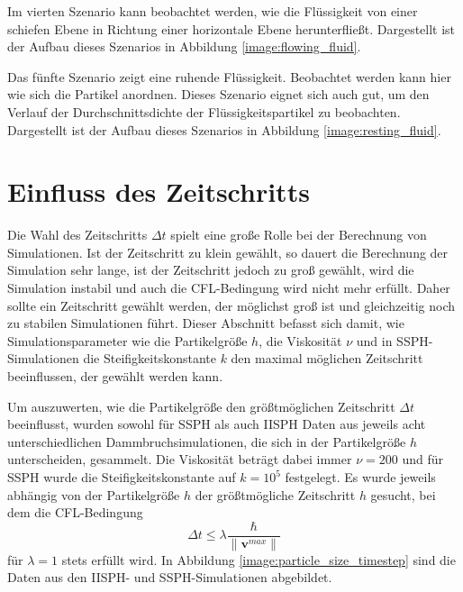 \documentclass[11pt,
a4paper,
parskip=half, %
BCOR=10mm, %
english,
ngerman]{scrreprt}
\begin{document}
Im vierten Szenario kann beobachtet werden, wie die Flüssigkeit von einer schiefen Ebene in Richtung einer horizontale Ebene herunterfließt.
Dargestellt ist der Aufbau dieses Szenarios in Abbildung \ref{image:flowing_fluid}.

Das fünfte Szenario zeigt eine ruhende Flüssigkeit.
Beobachtet werden kann hier wie sich die Partikel anordnen.
Dieses Szenario eignet sich auch gut, um den Verlauf der Durchschnittsdichte der Flüssigkeitspartikel zu beobachten.
Dargestellt ist der Aufbau dieses Szenarios in Abbildung \ref{image:resting_fluid}.


\section{Einfluss des Zeitschritts}
Die Wahl des Zeitschritts $\Delta t$ spielt eine große Rolle bei der Berechnung von Simulationen.
Ist der Zeitschritt zu klein gewählt, so dauert die Berechnung der Simulation sehr lange,
ist der Zeitschritt jedoch zu groß gewählt, wird die Simulation instabil und auch die CFL-Bedingung wird nicht mehr erfüllt.
Daher sollte ein Zeitschritt gewählt werden, der möglichst groß ist und gleichzeitig noch zu stabilen Simulationen führt.
Dieser Abschnitt befasst sich damit,
wie Simulationsparameter wie die Partikelgröße $h$, die Viskosität $\nu$ und in SSPH-Simulationen die Steifigkeitskonstante $k$
den maximal möglichen Zeitschritt beeinflussen, der gewählt werden kann.

Um auszuwerten, wie die Partikelgröße den größtmöglichen Zeitschritt $\Delta t$ beeinflusst,
wurden sowohl für SSPH als auch IISPH Daten aus jeweils acht unterschiedlichen Dammbruchsimulationen, die sich in der Partikelgröße $h$ unterscheiden, gesammelt.
Die Viskosität beträgt dabei immer $\nu = 200$ und für SSPH wurde die Steifigkeitskonstante auf $k = 10^5$ festgelegt.
Es wurde jeweils abhängig von der Partikelgröße $h$ der größtmögliche Zeitschritt $h$ gesucht, bei dem die CFL-Bedingung
\begin{equation}
    \Delta t \leq \lambda \frac{\hbar}{\|\textbf{v}^{max}\| }
\end{equation}
für $\lambda = 1$ stets erfüllt wird.
In Abbildung \ref{image:particle_size_timestep} sind die Daten aus den IISPH- und SSPH-Simulationen abgebildet.
\end{document}
